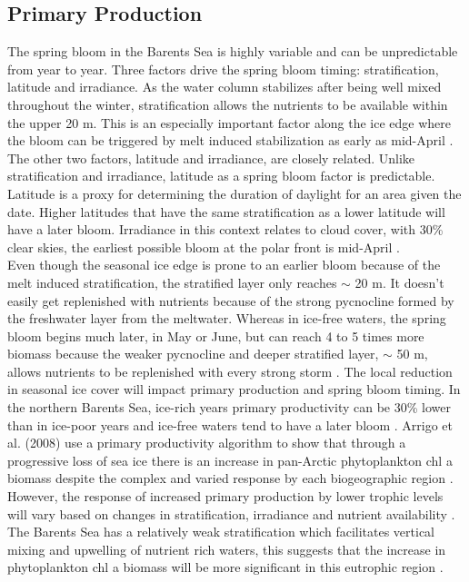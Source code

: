 \documentclass[a4paper, 12pt, Ariel]{article}
\begin{document}
\subsection{Primary Production}
The spring bloom in the Barents Sea is highly variable and can be unpredictable from year to year. Three factors drive the spring bloom timing: stratification, latitude and irradiance. As the water column stabilizes after being well mixed throughout the winter, stratification allows the nutrients to be available within the upper 20 m. This is an especially important factor along the ice edge where the bloom can be triggered by melt induced stabilization as early as mid-April \cite{Skjoldal1987}. The other two factors, latitude and irradiance, are closely related. Unlike stratification and irradiance, latitude as a spring bloom factor is predictable. Latitude is a proxy for determining the duration of daylight for an area given the date. Higher latitudes that have the same stratification as a lower latitude will have a later bloom. Irradiance in this context relates to cloud cover, with 30\% clear skies, the earliest possible bloom at the polar front is mid-April \cite{Sakshaug2009}. \\

Even though the seasonal ice edge is prone to an earlier bloom because of the melt induced stratification, the stratified layer only reaches $\sim$ 20 m. It doesn't easily get replenished with nutrients because of the strong pycnocline formed by the freshwater layer from the meltwater. Whereas in ice-free waters, the spring bloom begins much later, in May or June, but can reach 4 to 5 times more biomass because the weaker pycnocline and deeper stratified layer, $\sim$ 50 m, allows nutrients to be replenished with every strong storm \cite{Reigstad2002, Sakshaug2009}. The local reduction in seasonal ice cover will impact primary production and spring bloom timing. In the northern Barents Sea, ice-rich years primary productivity can be 30\% lower than in ice-poor years and ice-free waters tend to have a later bloom \cite{Sakshaug2009}. Arrigo et al. (2008) use a primary productivity algorithm to show that through a progressive loss of sea ice there is an increase in pan-Arctic phytoplankton chl a biomass despite the complex and varied response by each biogeographic region \cite{Arrigo2008, Ardyna2011}. However, the response of increased primary production by lower trophic levels will vary based on changes in stratification, irradiance and nutrient availability \cite{Tremblay2012}. The Barents Sea has a relatively weak stratification which facilitates vertical mixing and upwelling of nutrient rich waters, this suggests that the increase in phytoplankton chl a biomass will be more significant in this eutrophic region \cite{Ardyna2011}.
\end{document}
